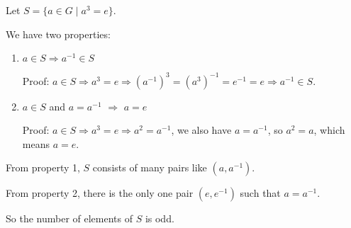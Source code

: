 \documentclass{article}
\begin{document}
		Let $S = \{ a \in G \mid a^3 = e \} $.

		We have two properties:

		\begin{enumerate}

				\item $a \in S \Rightarrow a^{-1} \in S$ 

						Proof: $a \in S \Rightarrow a^3 = e \Rightarrow (a^{-1})^3  = (a^3)^{-1} = e^{-1} = e \Rightarrow a^{-1} \in S$.

				\item $a \in S$ and $a = a^{-1}$ $\Rightarrow $ $a = e$

						Proof: $a \in S \Rightarrow a^3 = e \Rightarrow a^2 = a^{-1}$, we also have $a = a^{-1}$, so $a^2 = a$, which means $a = e$.

		\end{enumerate}

		From property 1, $S$ consists of many pairs like $(a,a^{-1})$. 

		From property 2, there is the only one pair $(e,e^{-1})$ such that $a = a^{-1}$.

		So the number of elements of $S$ is odd. 
\end{document}
